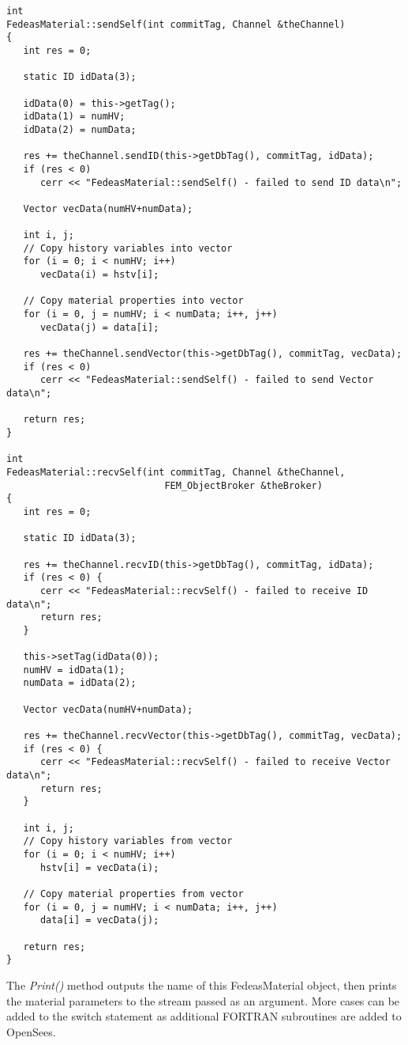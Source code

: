 \documentclass[12pt]{article}
\begin{document}
{\sf\small
\begin{verbatim}
int 
FedeasMaterial::sendSelf(int commitTag, Channel &theChannel)
{
   int res = 0;

   static ID idData(3);

   idData(0) = this->getTag();
   idData(1) = numHV;
   idData(2) = numData;

   res += theChannel.sendID(this->getDbTag(), commitTag, idData);
   if (res < 0) 
      cerr << "FedeasMaterial::sendSelf() - failed to send ID data\n";

   Vector vecData(numHV+numData);

   int i, j;
   // Copy history variables into vector
   for (i = 0; i < numHV; i++)
      vecData(i) = hstv[i];

   // Copy material properties into vector
   for (i = 0, j = numHV; i < numData; i++, j++)
      vecData(j) = data[i];

   res += theChannel.sendVector(this->getDbTag(), commitTag, vecData);
   if (res < 0) 
      cerr << "FedeasMaterial::sendSelf() - failed to send Vector data\n";

   return res;
}

int
FedeasMaterial::recvSelf(int commitTag, Channel &theChannel,
							FEM_ObjectBroker &theBroker)
{
   int res = 0;

   static ID idData(3);

   res += theChannel.recvID(this->getDbTag(), commitTag, idData);
   if (res < 0) {
      cerr << "FedeasMaterial::recvSelf() - failed to receive ID data\n";
      return res;
   }

   this->setTag(idData(0));
   numHV = idData(1);
   numData = idData(2);

   Vector vecData(numHV+numData);

   res += theChannel.recvVector(this->getDbTag(), commitTag, vecData);
   if (res < 0) {
      cerr << "FedeasMaterial::recvSelf() - failed to receive Vector data\n";
      return res;
   }

   int i, j;
   // Copy history variables from vector
   for (i = 0; i < numHV; i++)
      hstv[i] = vecData(i);

   // Copy material properties from vector
   for (i = 0, j = numHV; i < numData; i++, j++)
      data[i] = vecData(j);

   return res;
}
\end{verbatim}
}

\noindent The {\em Print()} method outputs the name of this FedeasMaterial object, then prints
the material parameters to the stream passed as an argument. More cases can be added to
the switch statement as additional FORTRAN subroutines are added to OpenSees.
    
\end{document}
